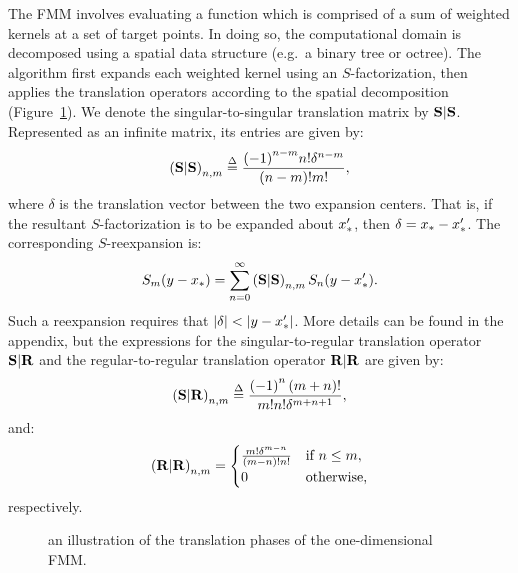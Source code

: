 The FMM involves evaluating a function which is comprised of a sum of
weighted kernels at a set of target points. In doing so, the
computational domain is decomposed using a spatial data structure
(e.g.\ a binary tree or octree). The algorithm first expands each
weighted kernel using an $S$-factorization, then applies the
translation operators according to the spatial decomposition
(Figure~\ref{fig:fmm}). We denote the singular-to-singular translation
matrix by $\bold{S}|\bold{S}$. Represented as an infinite matrix, its entries are
given by:
\begin{align}
  \label{eq:SSmat}
  \left(\bold{S}|\bold{S}\right)_{n,m} \overset{\Delta}{=} \frac{{(-1)}^{n-m} n! \delta^{n-m}}{(n-m)!m!},
\end{align}
where $\delta$ is the translation vector between the two expansion
centers. That is, if the resultant $S$-factorization is to be expanded
about ${x}_{*}'$, then $\delta = {x}_{*} - {x}_{*}'$. The corresponding
$S$-reexpansion is:
\begin{align}
  \label{eq:SSmat-reexpansion}
  S_m(y - {x}_{*}) = \sum_{n=0}^\infty \left(\bold{S}|\bold{S}\right)_{n,m} S_n(y - {x}_{*}').
\end{align}
Such a reexpansion requires that $\left|\delta\right| < \left|y -
  {x}_{*}'\right|$. More details can be found in the appendix, but the
expressions for the singular-to-regular translation operator $\bold{S}|\bold{R}$
and the regular-to-regular translation operator $\bold{R}|\bold{R}$ are given by:
\begin{align}
  \label{eq:SRmat}
  \left(\bold{S}|\bold{R}\right)_{n,m} \overset{\Delta}{=} {\left(-1\right)^n \left(m + n\right)! \over m! n! \delta^{m+n+1}},
\end{align}
and:
\begin{align}
  \label{eq:RRmat}
  \left(\bold{R}|\bold{R}\right)_{n,m} = \begin{cases}
    \frac{m! \delta^{m - n}}{(m - n)!n!} & \mbox{if } n \leq m, \\
    0 & \mbox{otherwise},
  \end{cases}
\end{align}
respectively.

\begin{figure}[h]
  \centering
  
  \caption{an illustration of the translation phases of the
    one-dimensional FMM.}\label{fig:fmm}
\end{figure}


